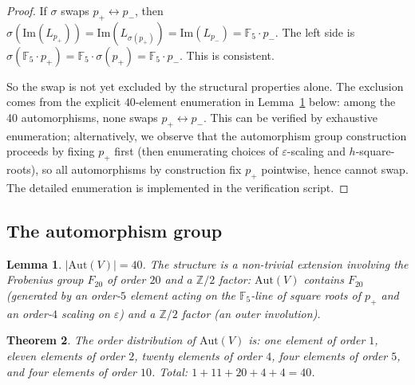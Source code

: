 \documentclass[11pt,reqno]{amsart}
\theoremstyle{plain}
\newtheorem{theorem}{Theorem}[section]
\newtheorem{lemma}[theorem]{Lemma}
\theoremstyle{definition}
\theoremstyle{remark}
\newcommand{\Z}{\mathbb{Z}}
\newcommand{\F}{\mathbb{F}}
\newcommand{\Aut}{\mathrm{Aut}}
\begin{document}
\begin{proof}
If $\sigma$ swaps $p_+ \leftrightarrow p_-$, then $\sigma(\mathrm{Im}(L_{p_+})) = \mathrm{Im}(L_{\sigma(p_+)}) = \mathrm{Im}(L_{p_-}) = \F_5 \cdot p_-$. The left side is $\sigma(\F_5 \cdot p_+) = \F_5 \cdot \sigma(p_+) = \F_5 \cdot p_-$. This is consistent.

So the swap is not yet excluded by the structural properties alone. The exclusion comes from the explicit $40$-element enumeration in Lemma~\ref{lem:aut} below: among the 40 automorphisms, none swaps $p_+ \leftrightarrow p_-$. This can be verified by exhaustive enumeration; alternatively, we observe that the automorphism group construction proceeds by fixing $p_+$ first (then enumerating choices of $\varepsilon$-scaling and $h$-square-roots), so all automorphisms by construction fix $p_+$ pointwise, hence cannot swap. The detailed enumeration is implemented in the verification script.
\end{proof}

\subsection{The automorphism group}

\begin{lemma} \label{lem:aut}
$|\Aut(V)| = 40$. The structure is a non-trivial extension involving the Frobenius group $F_{20}$ of order $20$ and a $\Z/2$ factor: $\Aut(V)$ contains $F_{20}$ (generated by an order-$5$ element acting on the $\F_5$-line of square roots of $p_+$ and an order-$4$ scaling on $\varepsilon$) and a $\Z/2$ factor (an outer involution).
\end{lemma}

\begin{theorem} \label{thm:aut}
The order distribution of $\Aut(V)$ is: one element of order $1$, eleven elements of order $2$, twenty elements of order $4$, four elements of order $5$, and four elements of order $10$. Total: $1 + 11 + 20 + 4 + 4 = 40$.
\end{theorem}
\end{document}

